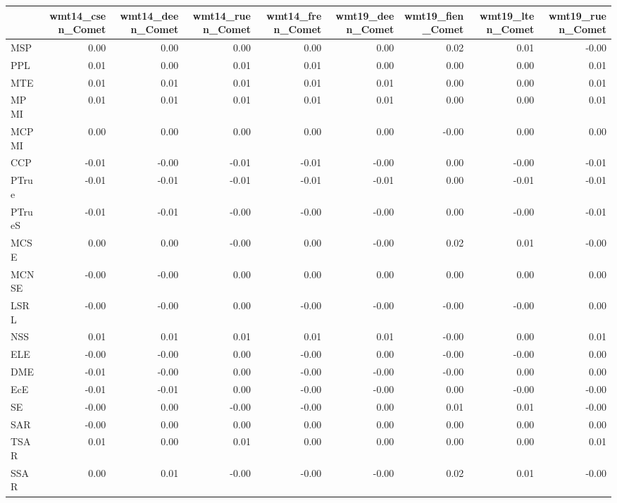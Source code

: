\begin{tabular}{lrrrrrrrr}
\toprule
 & wmt14\_csen\_Comet & wmt14\_deen\_Comet & wmt14\_ruen\_Comet & wmt14\_fren\_Comet & wmt19\_deen\_Comet & wmt19\_fien\_Comet & wmt19\_lten\_Comet & wmt19\_ruen\_Comet \\
\midrule
MSP & 0.00 & 0.00 & 0.00 & 0.00 & 0.00 & 0.02 & 0.01 & -0.00 \\
PPL & 0.01 & 0.00 & 0.01 & 0.01 & 0.00 & 0.00 & 0.00 & 0.01 \\
MTE & 0.01 & 0.01 & 0.01 & 0.01 & 0.01 & 0.00 & 0.00 & 0.01 \\
MPMI & 0.01 & 0.01 & 0.01 & 0.01 & 0.01 & 0.00 & 0.00 & 0.01 \\
MCPMI & 0.00 & 0.00 & 0.00 & 0.00 & 0.00 & -0.00 & 0.00 & 0.00 \\
CCP & -0.01 & -0.00 & -0.01 & -0.01 & -0.00 & 0.00 & -0.00 & -0.01 \\
PTrue & -0.01 & -0.01 & -0.01 & -0.01 & -0.01 & 0.00 & -0.01 & -0.01 \\
PTrueS & -0.01 & -0.01 & -0.00 & -0.00 & -0.00 & 0.00 & -0.00 & -0.01 \\
MCSE & 0.00 & 0.00 & -0.00 & 0.00 & -0.00 & 0.02 & 0.01 & -0.00 \\
MCNSE & -0.00 & -0.00 & 0.00 & 0.00 & 0.00 & 0.00 & 0.00 & 0.00 \\
LSRL & -0.00 & -0.00 & 0.00 & -0.00 & -0.00 & -0.00 & -0.00 & 0.00 \\
NSS & 0.01 & 0.01 & 0.01 & 0.01 & 0.01 & -0.00 & 0.00 & 0.01 \\
ELE & -0.00 & -0.00 & 0.00 & -0.00 & 0.00 & -0.00 & -0.00 & 0.00 \\
DME & -0.01 & -0.00 & 0.00 & -0.00 & -0.00 & -0.00 & 0.00 & 0.00 \\
EcE & -0.01 & -0.01 & 0.00 & -0.00 & -0.00 & 0.00 & -0.00 & -0.00 \\
SE & -0.00 & 0.00 & -0.00 & -0.00 & 0.00 & 0.01 & 0.01 & -0.00 \\
SAR & -0.00 & 0.00 & 0.00 & 0.00 & 0.00 & 0.00 & 0.00 & 0.00 \\
TSAR & 0.01 & 0.00 & 0.01 & 0.00 & 0.00 & 0.00 & 0.00 & 0.01 \\
SSAR & 0.00 & 0.01 & -0.00 & -0.00 & -0.00 & 0.02 & 0.01 & -0.00 \\
\bottomrule
\end{tabular}
